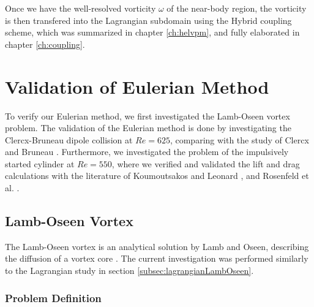 Once we have the well-resolved vorticity $\omega$ of the near-body region, the vorticity is then transfered into the Lagrangian subdomain using the Hybrid coupling scheme, which was summarized in chapter \ref{ch:helvpm}, and fully elaborated in chapter \ref{ch:coupling}.

\section{Validation of Eulerian Method}
\label{sec:eu-voem}

To verify our Eulerian method, we first investigated the Lamb-Oseen vortex problem. The validation of the Eulerian method is done by investigating the Clercx-Bruneau dipole collision at $Re=625$, comparing with the study of Clercx and Bruneau \cite{Clercx2006a}. Furthermore, we investigated the problem of the impulsively started cylinder at $Re=550$, where we verified and validated the lift and drag calculations with the literature of Koumoutsakos and Leonard \cite{Koumoutsakos1995a}, and Rosenfeld et al. \cite{MosheRosenFeldDochanKwak1991}.

\subsection{Lamb-Oseen Vortex}
\label{subsec:eulerianLambOseen}

The Lamb-Oseen vortex is an analytical solution by Lamb and Oseen, describing the diffusion of a vortex core \cite{Tryggeson2007}. The current investigation was performed similarly to the Lagrangian study in section \ref{subsec:lagrangianLambOseen}. 

\subsubsection*{Problem Definition}

